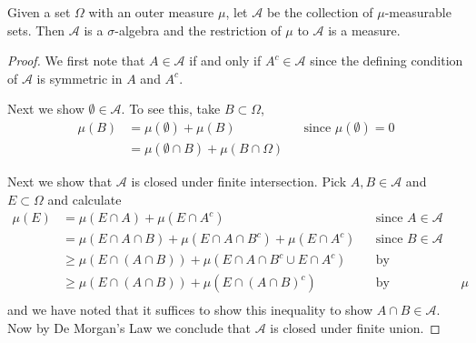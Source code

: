 \begin{lem}\label{CaratheodoryRestriction}Given a set $\Omega$ with an outer measure $\mu$, let
$\mathcal{A}$ be the collection of $\mu$-measurable sets.  Then
$\mathcal{A}$ is a $\sigma$-algebra and the
  restriction of $\mu$ to $\mathcal{A}$ is a measure.
\end{lem}
\begin{proof}We first note that $A \in \mathcal{A}$ if and only if $A^c
  \in \mathcal{A}$ since the defining condition of $\mathcal{A}$ is
  symmetric in $A$ and $A^c$.

Next we show $\emptyset \in \mathcal{A}$.  To see this,
  take $B \subset \Omega$,
\begin{align*}
\mu(B) &= \mu(\emptyset) + \mu(B) & &\text{since $\mu(\emptyset) = 0$}
\\
& = \mu(\emptyset \cap B) + \mu(B \cap \Omega)
\end{align*}

Next we show that $\mathcal{A}$ is closed under finite intersection.
Pick $A, B \in \mathcal{A}$ and $E \subset \Omega$ and calculate
\begin{align*}
\mu(E) &= \mu(E \cap A) + \mu(E \cap A^c) & &\text{since $A \in
  \mathcal{A}$} \\
&= \mu(E \cap A \cap B) + \mu(E \cap A \cap B^c) +\mu(E \cap A^c) & &\text{since $B \in
  \mathcal{A}$} \\
&\geq \mu(E \cap (A \cap B)) + \mu(E \cap A \cap B^c \cup E \cap A^c)
& & \text{by subadditivity} \\
&\geq \mu(E \cap (A \cap B)) + \mu(E \cap (A \cap B)^c)
& & \text{by monotonicity of $\mu$} \\
\end{align*}
and we have noted that it suffices to show this inequality to show $A
\cap B \in \mathcal{A}$.  Now by De Morgan's Law we conclude that
$\mathcal{A}$ is closed under finite union.


\end{proof}
